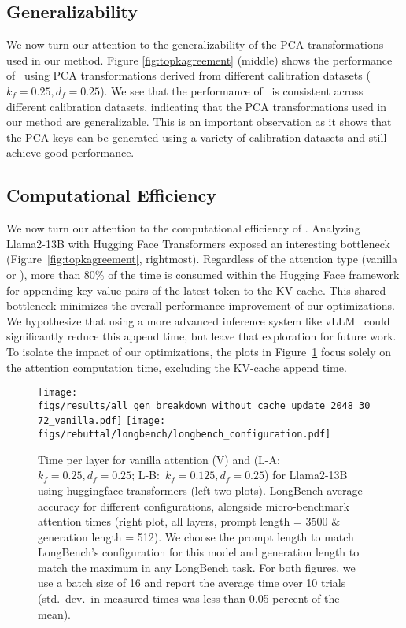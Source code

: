 \subsection{Generalizability}

We now turn our attention to the generalizability of the PCA transformations
used in our method. Figure \ref{fig:topkagreement} (middle) shows the
performance of \method~using PCA transformations derived from different
calibration datasets ($k_f = 0.25, d_f = 0.25$).  We see that the performance
of \method~is consistent across different calibration datasets, indicating that
the PCA transformations used in our method are generalizable. This is an
important observation as it shows that the PCA keys can be generated using a
variety of calibration datasets and still achieve good performance. 

\subsection{Computational Efficiency}

We now turn our attention to the computational efficiency of \method. Analyzing
Llama2-13B with Hugging Face Transformers exposed an interesting bottleneck
(Figure~\ref{fig:topkagreement}, rightmost). Regardless of the attention type
(vanilla or \method), more than 80\% of the time is consumed within the Hugging
Face framework for appending key-value pairs of the latest token to the
KV-cache. This shared bottleneck minimizes the overall performance improvement
of our optimizations. We hypothesize that using a more advanced inference
system like vLLM~\cite{woosuk2023vllm} could significantly reduce this append
time, but leave that exploration for future work. To isolate the impact of our
optimizations, the plots in Figure~\ref{fig:compute} focus solely on the
attention computation time, excluding the KV-cache append time.

\begin{figure}[h]
  \texttt{[image: figs/results/all\_gen\_breakdown\_without\_cache\_update\_2048\_3072\_vanilla.pdf]}
  \texttt{[image: figs/rebuttal/longbench/longbench\_configuration.pdf]}
  \caption{Time per layer for vanilla attention (V) and \method (\mbox{L-A:
${k_f=0.25,d_f=0.25}$}; \mbox{L-B: ${k_f=0.125,d_f=0.25}$}) for Llama2-13B
using huggingface transformers (left two plots). LongBench average accuracy for
different \method configurations, alongside micro-benchmark attention times (right plot, all
layers, prompt length = 3500 \& generation length = 512). We choose the prompt
length to match LongBench’s configuration for this model and generation length
to match the maximum in any LongBench task. For both figures, we use a batch
size of 16 and report the average time over 10 trials (std.~dev.~in measured times
was less than 0.05 percent of the mean).}
  \label{fig:compute}
\end{figure}

